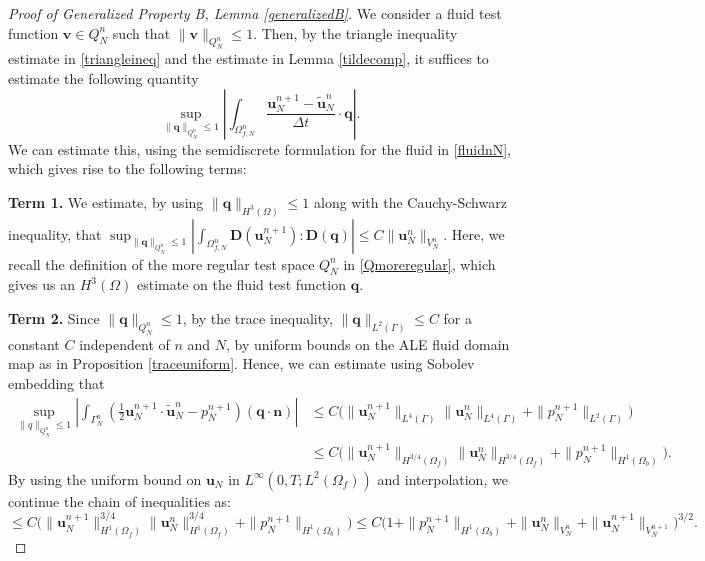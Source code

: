 \documentclass[11pt]{article}
\newcommand{\bd}{\boldsymbol}
\theoremstyle{definition}
\begin{document}
\begin{proof}[Proof of Generalized Property B, Lemma \ref{generalizedB}]
We consider a fluid test function $\bd{v} \in Q^{n}_{N}$ such that $\|\bd{v}\|_{Q^{n}_{N}} \le 1$. Then, by the triangle inequality estimate in \eqref{triangleineq} and the estimate in Lemma \ref{tildecomp}, it suffices to estimate the following quantity
\begin{equation*}
\sup_{\|\bd{q}\|_{Q^{n}_{N}} \le 1} \left|\int_{\Omega^{n}_{f, N}} \frac{\bd{u}^{n + 1}_{N} - \tilde{\bd{u}}^{n}_{N}}{\Delta t} \cdot \bd{q}\right|.
\end{equation*}
We can estimate this, using the semidiscrete formulation for the fluid in \eqref{fluidnN}, which gives rise to the following terms:

\medskip

\noindent \textbf{Term 1.} We estimate, by using $\|\bd{q}\|_{H^{3}(\Omega)} \le 1$ along with the Cauchy-Schwarz inequality, that $\displaystyle \sup_{\|\bd{q}\|_{Q^{n}_{N}} \le 1} \left|\int_{\Omega^{n}_{f, N}} \bd{D}(\bd{u}^{n + 1}_{N}) : \bd{D}(\bd{q})\right| \le C\|\bd{u}^{n}_{N}\|_{V^{n}_{N}}$. Here, we recall the definition of the more regular test space $Q^{n}_{N}$ in \eqref{Qmoreregular}, which gives us an $H^{3}(\Omega)$ estimate on the fluid test function $\bd{q}$. 

\medskip

\noindent \textbf{Term 2.} Since $\|\bd{q}\|_{Q^{n}_{N}} \le 1$, by the trace inequality, $\|\bd{q}\|_{L^{2}(\Gamma)} \le C$ for a constant $C$ independent of $n$ and $N$, by uniform bounds on the ALE fluid domain map as in Proposition \ref{traceuniform}. Hence, we can estimate using Sobolev embedding that
\begin{align*}
\sup_{\|q\|_{Q^{n}_{N}} \le 1} \left|\int_{\Gamma^{n}_{N}} \left(\frac{1}{2} \bd{u}^{n + 1}_{N} \cdot \tilde{\bd{u}}^{n}_{N} - p^{n + 1}_{N}\right) (\bd{q} \cdot \bd{n})\right| &\le C\Big(\|\bd{u}^{n + 1}_{N}\|_{L^{4}(\Gamma)} \|\bd{u}^{n}_{N}\|_{L^{4}(\Gamma)} + \|p^{n + 1}_{N}\|_{L^{2}(\Gamma)}\Big) \\
&\le C\Big(\|\bd{u}^{n + 1}_{N}\|_{H^{3/4}(\Omega_{f})} \|\bd{u}^{n}_{N}\|_{H^{3/4}(\Omega_{f})} + \|p^{n + 1}_{N}\|_{H^{1}(\Omega_{b})}\Big).
\end{align*}
By using the uniform bound on $\bd{u}_{N}$ in $L^{\infty}(0, T; L^{2}(\Omega_{f}))$ and interpolation, we continue the chain of inequalities as:
\begin{equation*}
\le C\Big(\|\bd{u}^{n + 1}_{N}\|^{3/4}_{H^{1}(\Omega_{f})} \|\bd{u}^{n}_{N}\|^{3/4}_{H^{1}(\Omega_{f})} + \|p^{n + 1}_{N}\|_{H^{1}(\Omega_{b})}\Big) \le C\Big(1 + \|p^{n + 1}_{N}\|_{H^{1}(\Omega_{b})} + \|\bd{u}^{n}_{N}\|_{V^{n}_{N}} + \|\bd{u}^{n + 1}_{N}\|_{V^{n + 1}_{N}}\Big)^{3/2}.
\end{equation*}


\end{proof}
\end{document}
